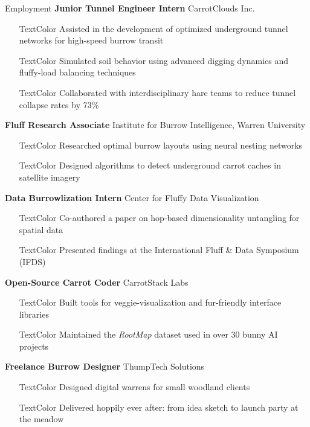 \begin{rubric}{Employment}	
	\textbf{Junior Tunnel Engineer Intern} CarrotClouds Inc.
	\begin{itemize}[label={-}, labelsep=2pt, leftmargin=5pt]
		\item[TextColor] Assisted in the development of optimized underground tunnel networks for high-speed burrow transit
		\item[TextColor] Simulated soil behavior using advanced digging dynamics and fluffy-load balancing techniques
		\item[TextColor] Collaborated with interdisciplinary hare teams to reduce tunnel collapse rates by 73\%
	\end{itemize}
	
	\textbf{Fluff Research Associate} Institute for Burrow Intelligence, Warren University
	\begin{itemize}[label={-}, labelsep=2pt, leftmargin=5pt]
		\item[TextColor] Researched optimal burrow layouts using neural nesting networks
		\item[TextColor] Designed algorithms to detect underground carrot caches in satellite imagery
	\end{itemize}
	
	\textbf{Data Burrowlization Intern} Center for Fluffy Data Visualization
	\begin{itemize}[label={-}, labelsep=2pt, leftmargin=5pt]
		\setlength\itemsep{0.0em}
		\item[TextColor] Co-authored a paper on hop-based dimensionality untangling for spatial data
		\item[TextColor] Presented findings at the International Fluff \& Data Symposium (IFDS)
	\end{itemize}
	
	\textbf{Open-Source Carrot Coder} CarrotStack Labs
	\begin{itemize}[label={-}, labelsep=2pt, leftmargin=5pt]
		\setlength\itemsep{0.0em}
		\item[TextColor] Built tools for veggie-visualization and fur-friendly interface libraries
		\item[TextColor] Maintained the \emph{RootMap} dataset used in over 30 bunny AI projects
	\end{itemize}
	
	\textbf{Freelance Burrow Designer} ThumpTech Solutions
	\begin{itemize}[label={-}, labelsep=2pt, leftmargin=5pt]
		\setlength\itemsep{0.0em}
		\item[TextColor] Designed digital warrens for small woodland clients
		\item[TextColor] Delivered hoppily ever after: from idea sketch to launch party at the meadow
		\vspace*{-\baselineskip}
	\end{itemize}
\end{rubric}